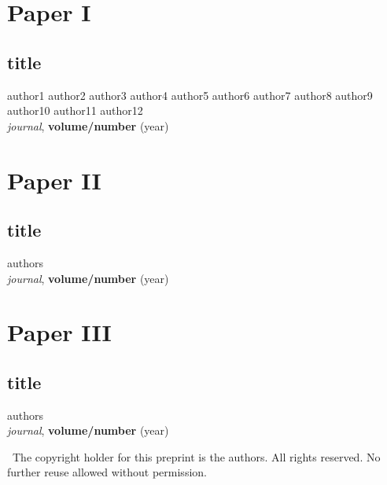\chapter*{Paper I}
\begin{minipage}[c]{\rmpw\linewidth}
\section*{title}
\noindent author1 author2 author3 author4 author5 author6 author7 author8 author9 author10 author11 author12\\
\noindent \textit{journal}, \textbf{volume/number} (year)
\end{minipage}
\cleardoublepage
%
%

\chapter*{Paper II}
\begin{minipage}[c]{\rmpw\linewidth}
\section*{title}
\noindent authors\\
\noindent \textit{journal}, \textbf{volume/number} (year)
\end{minipage}
\cleardoublepage

\chapter*{Paper III}
\begin{minipage}[c]{\rmpw \linewidth}
\section*{title}
\noindent authors\\
\noindent \textit{journal}, \textbf{volume/number} (year)
\end{minipage}

\newpage
\vspace*{\fill}
\noindent\textcopyright~The copyright holder for this preprint is the authors. All rights reserved. No further reuse allowed without permission. 


